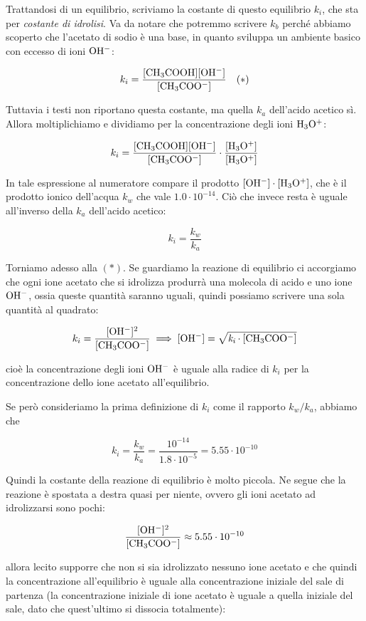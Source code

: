 Trattandosi di un equilibrio, scriviamo la costante di questo equilibrio $k_i$, che sta per \textit{costante di idrolisi}. Va da notare che potremmo scrivere $k_b$ perché abbiamo scoperto che l'acetato di sodio è una base, in quanto sviluppa un ambiente basico con eccesso di ioni $\rm OH^-$:

$$k_i = \rm{\frac{[CH_3COOH] [OH^-]}{[CH_3COO^-]}} \quad (*)$$

Tuttavia i testi non riportano questa costante, ma quella $k_a$ dell'acido acetico sì. Allora moltiplichiamo e dividiamo per la concentrazione degli ioni $\rm H_3O^+$:

$$k_i = \rm{\frac{[CH_3COOH] [OH^-]}{[CH_3COO^-]} \cdot \frac{[H_3O^+]}{[H_3O^+]}}$$

In tale espressione al numeratore compare il prodotto $\rm [OH^-] \cdot [H_3O^+]$, che è il prodotto ionico dell'acqua $k_w$ che vale $1.0 \cdot 10^{-14}$. Ciò che invece resta è uguale all'inverso della $k_a$ dell'acido acetico:

$$k_i = \frac{k_w}{k_a}$$

Torniamo adesso alla $(*)$. Se guardiamo la reazione di equilibrio ci accorgiamo che ogni ione acetato che si idrolizza produrrà una molecola di acido e uno ione $\rm OH^-$, ossia queste quantità saranno uguali, quindi possiamo scrivere una sola quantità al quadrato:

$$k_i = \rm{\frac{[OH^-]^2}{[CH_3COO^-]}} \implies [OH^-]= \sqrt{\textit{k}_\textit{i} \cdot [CH_3COO^-]}$$

cioè la concentrazione degli ioni $\rm OH^-$ è uguale alla radice di $k_i$ per la concentrazione dello ione acetato all'equilibrio.

Se però consideriamo la prima definizione di $k_i$ come il rapporto $k_w/k_a$, abbiamo che

$$k_i = \frac{k_w}{k_a} = \frac{10^{-14}}{1.8 \cdot 10^{-5}}=5.55 \cdot 10^{-10}$$

Quindi la costante della reazione di equilibrio è molto piccola. Ne segue che la reazione è spostata a destra quasi per niente, ovvero gli ioni acetato ad idrolizzarsi sono pochi:

$$\rm{\frac{[OH^-]^2}{[CH_3COO^-]}} \approx 5.55 \cdot 10^{-10}$$

\E allora lecito supporre che non si sia idrolizzato nessuno ione acetato e che quindi la concentrazione all'equilibrio è uguale alla concentrazione iniziale del sale di partenza (la concentrazione iniziale di ione acetato è uguale a quella iniziale del sale, dato che quest'ultimo si dissocia totalmente):

